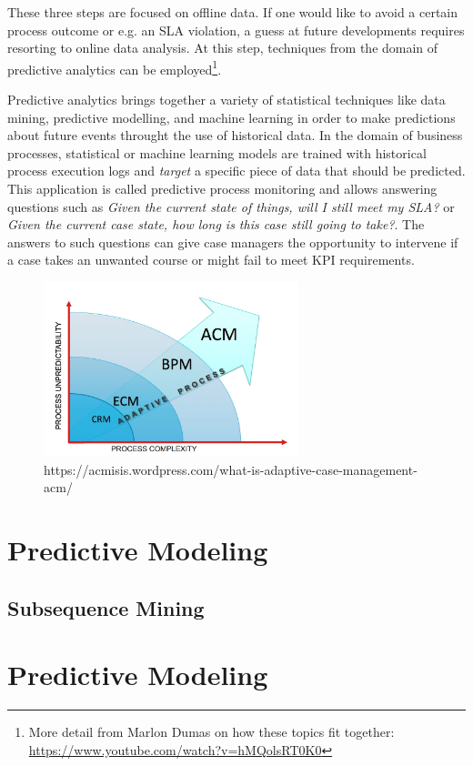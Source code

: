 These three steps are focused on offline data.
If one would like to avoid a certain process outcome  or e.g. an SLA violation, a guess at future developments requires resorting to online data analysis.
At this step, techniques from the domain of predictive analytics can be employed\footnote{More detail from Marlon Dumas on how these topics fit together: \url{https://www.youtube.com/watch?v=hMQolsRT0K0}}.

Predictive analytics brings together a variety of statistical techniques like data mining, predictive modelling, and machine learning in order to make predictions about future events throught the use of historical data.
In the domain of business processes, statistical or machine learning models are trained with historical process execution logs and \textit{target} a specific piece of data that should be predicted.
This application is called predictive process monitoring and allows answering questions such as \textit{Given the current state of things, will I still meet my SLA?} or \textit{Given the current case state, how long is this case still going to take?}.
The answers to such questions can give case managers the opportunity to intervene if a case takes an unwanted course or might fail to meet KPI requirements.


\begin{figure}
	\centering
	\includegraphics[width=20em]{gfx/acm-reasoning}
	\caption{https://acmisis.wordpress.com/what-is-adaptive-case-management-acm/}
	\label{fig:why-acm}
\end{figure}

\section{Predictive Modeling}
\subsection{Subsequence Mining}

\section{Predictive Modeling}
